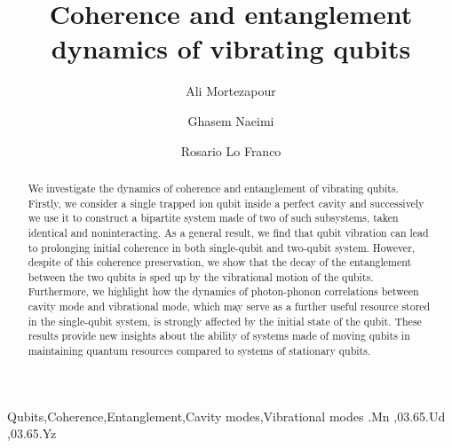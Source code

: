 \documentclass[twocolumn,3p,times]{elsarticle}
\begin{document}
\begin{frontmatter}


\title{Coherence and entanglement dynamics of vibrating qubits}

\author[rvt]{Ali Mortezapour}
\author[focal]{Ghasem Naeimi}
\author[els,extra]{Rosario Lo Franco}
\address[rvt]{Department of Physics, University of Guilan, P. O. Box 41335-1914, Rasht, Iran}
\address[focal]{Physics Groups, Qazvin Branch, Islamic Azad University, Qazvin, Iran}
\address[els]{Dipartimento di Energia, Ingegneria dell’Informazione e Modelli Matematici, Università di Palermo, Viale delle Scienze, Edificio 9, 90128 Palermo, Italy}
\address[extra]{Dipartimento di Fisica e Chimica, Università di Palermo, via Archirafi 36, 90123, Palermo, Italy}

\begin{abstract}
We investigate the dynamics of coherence and entanglement of vibrating qubits. Firstly, we consider a single trapped ion qubit inside a perfect cavity and successively we use it to construct a bipartite system made of two of such subsystems, taken identical and noninteracting. As a general result, we find that qubit vibration can lead to prolonging initial coherence in both single-qubit and two-qubit system. However, despite of this coherence preservation, we show that the decay of the entanglement between the two qubits is sped up by the vibrational motion of the qubits. Furthermore, we highlight how the dynamics of photon-phonon correlations between cavity mode and vibrational mode, which may serve as a further useful resource stored in the single-qubit system, is strongly affected by the initial state of the qubit. These results provide new insights about the ability of systems made of moving qubits in maintaining quantum resources compared to systems of stationary qubits.
\end{abstract}

\begin{keyword}
Qubits\sep Coherence\sep Entanglement\sep Cavity modes\sep Vibrational modes 
.Mn \sep 03.65.Ud \sep 03.65.Yz  
\end{keyword}

\end{frontmatter}
\end{document}

